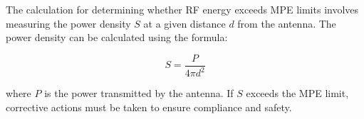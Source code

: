 The calculation for determining whether RF energy exceeds MPE limits involves measuring the power density \( S \) at a given distance \( d \) from the antenna. The power density can be calculated using the formula:

\[ S = \frac{P}{4 \pi d^2} \]

where \( P \) is the power transmitted by the antenna. If \( S \) exceeds the MPE limit, corrective actions must be taken to ensure compliance and safety.

